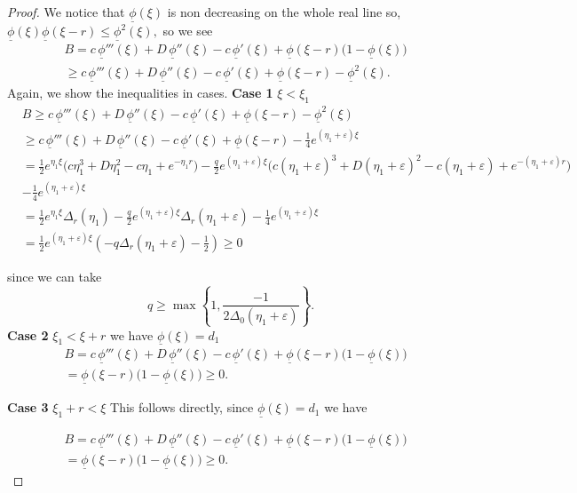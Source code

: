 \documentclass[12pt,letterpaper]{amsart}
\theoremstyle{definition}
\theoremstyle{remark}
\numberwithin{equation}{section}
\begin{document}
 \begin{proof}
 We notice that $ \underline\phi(\xi)$ is non decreasing on the whole real line so, $ \underline\phi(\xi) \underline\phi(\xi-r)\le \underline\phi^2(\xi),$ so we see
 \[\begin{split}
  &B=	c\,\underline\phi'''(\xi) + D\,\underline\phi''(\xi) - c\,\underline\phi'(\xi) + \underline\phi(\xi-r)\bigl(1-\underline\phi(\xi)\bigr) \\
 & \ge c\,\underline\phi'''(\xi) + D\,\underline\phi''(\xi) - c\,\underline\phi'(\xi) + \underline\phi(\xi-r)-\underline\phi^2(\xi).
 \end{split}\]
Again, we show the inequalities in cases. 
 \textbf{Case 1} $\xi<\xi_1$
\[
\begin{split}
&B\ge c\,\underline\phi'''(\xi) + D\,\underline\phi''(\xi) - c\,\underline\phi'(\xi) + \underline\phi(\xi-r)-\underline\phi^2(\xi)\\
 & \ge c\,\underline\phi'''(\xi) + D\,\underline\phi''(\xi) - c\,\underline\phi'(\xi) + \underline\phi(\xi-r)-\frac{1}{4} e^{(\eta_1+\varepsilon) \xi} \\
&= \frac{1}{2} e^{\eta_1 \xi} \bigl(c\eta_1^3 + D\eta_1^2 - c\eta_1+e^{-\eta_1 r}\bigr)
 - \frac{q}{2} e^{(\eta_1 + \varepsilon)\xi}
   \bigl(c(\eta_1 + \varepsilon)^3 + D(\eta_1 + \varepsilon)^2 - c(\eta_1 + \varepsilon)+e^{-(\eta_1+\varepsilon) r}\bigr)\\
   &-\frac{1}{4} e^{(\eta_1+\varepsilon) \xi} \\
   &=\frac{1}{2} e^{\eta_1 \xi}\Delta_r(\eta_1) -\frac{q}{2} e^{(\eta_1 + \varepsilon)\xi}\Delta_r(\eta_1+\varepsilon)-\frac{1}{4} e^{(\eta_1+\varepsilon) \xi}\\
   &=\frac{1}{2}e^{(\eta_1 + \varepsilon)\xi}\left(-q\Delta_r(\eta_1+\varepsilon)-\frac{1}{2}\right)\ge 0
\end{split}
\]

since we can take
\[q\ge \max \left\{1, \frac{-1}{2\Delta_0(\eta_1+\varepsilon)}\right\}.\]
 \textbf{Case 2} $\xi_1<\xi+r$ we have $\underline\phi(\xi)=d_1$
  \[\begin{split}
  &B=	c\,\underline\phi'''(\xi) + D\,\underline\phi''(\xi) - c\,\underline\phi'(\xi) + \underline\phi(\xi-r)\bigl(1-\underline\phi(\xi)\bigr) \\
 &=  \underline\phi(\xi-r)\bigl(1-\underline\phi(\xi)\bigr)\ge 0.
 \end{split}\]

  \textbf{Case 3} $\xi_1+r<\xi$ This follows directly, since $\underline\phi(\xi)=d_1$ we have 

   \[\begin{split}
  &B=	c\,\underline\phi'''(\xi) + D\,\underline\phi''(\xi) - c\,\underline\phi'(\xi) + \underline\phi(\xi-r)\bigl(1-\underline\phi(\xi)\bigr) \\
 &=  \underline\phi(\xi-r)\bigl(1-\underline\phi(\xi)\bigr)\ge 0.
 \end{split}\]
 \end{proof}
 
\end{document}
